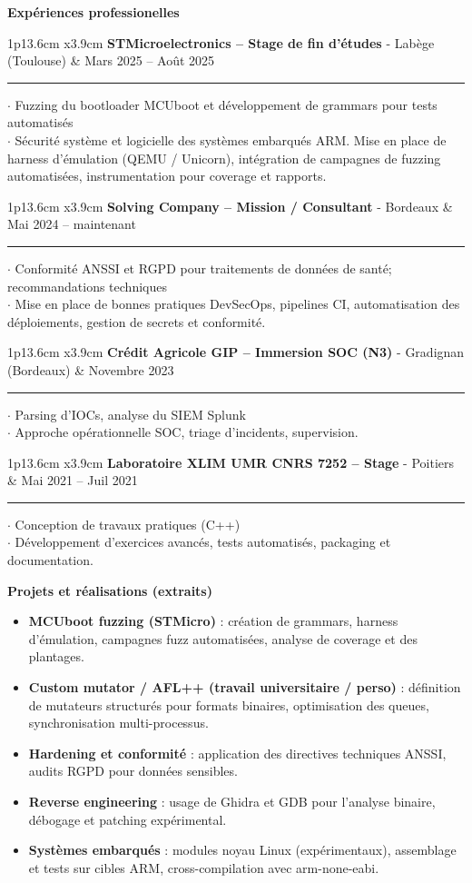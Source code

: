 \documentclass[10pt,a4paper]{article}
\newcommand{\cvsection}[1]{\begin{center}\large\textcolor{sectcol}{\textbf{#1}}\end{center}}
\newcommand{\cvevent}[5]{%
\begin{tabular*}{1\textwidth}{p{13.6cm}  x{3.9cm}}
	\textbf{#2} - \textcolor{bgcol}{#3} &   \vspace{2.5pt}\textcolor{sectcol}{#1}
\end{tabular*}
\vspace{-8pt}
\textcolor{softcol}{\hrule}
\vspace{6pt}
  $\cdot$ #4\\[3pt]
  $\cdot$ #5\\[6pt]
}
\begin{document}
\pagebreak

\cvsection{Expériences professionelles}

\cvevent{Mars 2025 -- Août 2025}{STMicroelectronics -- Stage de fin d'études}{Labège (Toulouse)}{Fuzzing du bootloader MCUboot et développement de grammars pour tests automatisés}{Sécurité système et logicielle des systèmes embarqués ARM. Mise en place de harness d'émulation (QEMU / Unicorn), intégration de campagnes de fuzzing automatisées, instrumentation pour coverage et rapports.}

\cvevent{Mai 2024 -- maintenant}{Solving Company -- Mission / Consultant}{Bordeaux}{Conformité ANSSI et RGPD pour traitements de données de santé; recommandations techniques}{Mise en place de bonnes pratiques DevSecOps, pipelines CI, automatisation des déploiements, gestion de secrets et conformité.}

\cvevent{Novembre 2023}{Crédit Agricole GIP -- Immersion SOC (N3)}{Gradignan (Bordeaux)}{Parsing d'IOCs, analyse du SIEM Splunk}{Approche opérationnelle SOC, triage d'incidents, supervision.}

\cvevent{Mai 2021 -- Juil 2021}{Laboratoire XLIM UMR CNRS 7252 -- Stage}{Poitiers}{Conception de travaux pratiques (C++)}{Développement d'exercices avancés, tests automatisés, packaging et documentation.}

\vspace{6pt}
\cvsection{Projets et réalisations (extraits)}
\begin{itemize}
  \item \textbf{MCUboot fuzzing (STMicro)} : création de grammars, harness d'émulation, campagnes fuzz automatisées, analyse de coverage et des plantages.
  \item \textbf{Custom mutator / AFL++ (travail universitaire / perso)} : définition de mutateurs structurés pour formats binaires, optimisation des queues, synchronisation multi-processus.
  \item \textbf{Hardening et conformité} : application des directives techniques ANSSI, audits RGPD pour données sensibles.
  \item \textbf{Reverse engineering} : usage de Ghidra et GDB pour l'analyse binaire, débogage et patching expérimental.
  \item \textbf{Systèmes embarqués} : modules noyau Linux (expérimentaux), assemblage et tests sur cibles ARM, cross-compilation avec arm-none-eabi.
\end{itemize}
\end{document}
